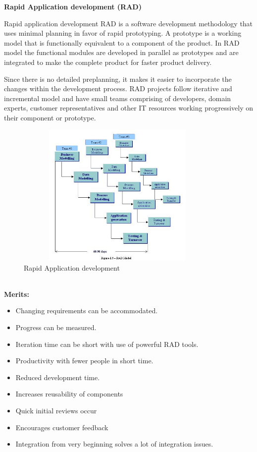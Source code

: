 \documentclass{article}
\begin{document}
\vspace{0.5cm}

\large{\textbf{Rapid Application development (RAD)}}

Rapid application development RAD is a software development methodology that uses minimal planning in favor of rapid prototyping. A prototype is a working model that is functionally equivalent to a component of the product.
In RAD model the functional modules are developed in parallel as prototypes and are integrated to make the complete product for faster product delivery.

Since there is no detailed preplanning, it makes it easier to incorporate the changes within the development process. RAD projects follow iterative and incremental model and have small teams comprising of developers, domain experts, customer representatives and other IT resources working progressively on their component or prototype.\\
\begin{figure}
  \includegraphics[width=10cm, height=7cm]{fig8.jpg}
  \caption{Rapid Application development }
  
\end{figure}
\vspace{13cm}
\\\textbf{Merits:}
\begin{itemize}
\item	Changing requirements can be accommodated.
\item	Progress can be measured.
\item	Iteration time can be short with use of powerful RAD tools.
\item	Productivity with fewer people in short time.
\item	Reduced development time.
\item	Increases reusability of components
\item	Quick initial reviews occur
\item	Encourages customer feedback
\item	Integration from very beginning solves a lot of integration issues.
\end{itemize}
\end{document}
